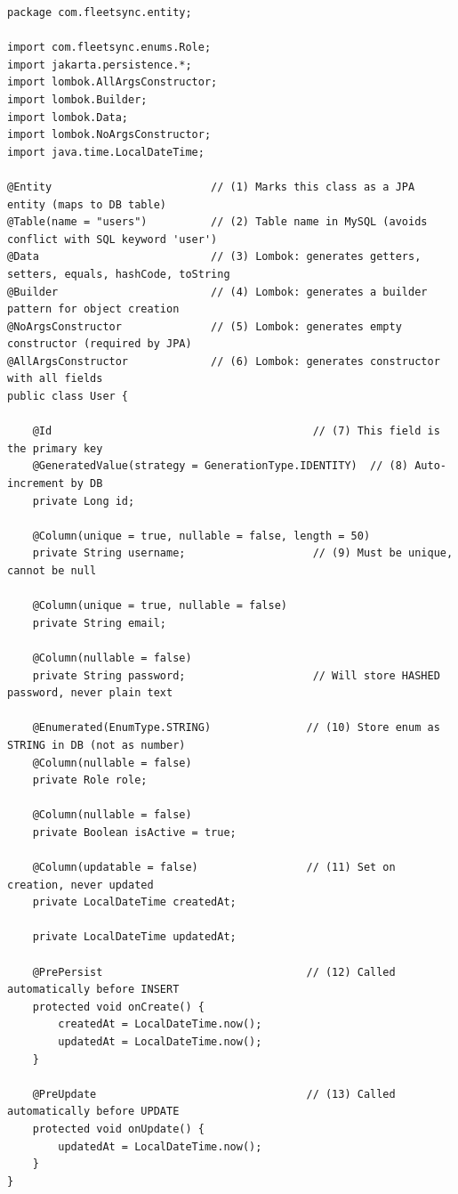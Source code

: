 \documentclass[12pt,a4paper]{report}
\begin{document}
\begin{lstlisting}[caption=User.java -- The User Entity]
package com.fleetsync.entity;

import com.fleetsync.enums.Role;
import jakarta.persistence.*;
import lombok.AllArgsConstructor;
import lombok.Builder;
import lombok.Data;
import lombok.NoArgsConstructor;
import java.time.LocalDateTime;

@Entity                         // (1) Marks this class as a JPA entity (maps to DB table)
@Table(name = "users")          // (2) Table name in MySQL (avoids conflict with SQL keyword 'user')
@Data                           // (3) Lombok: generates getters, setters, equals, hashCode, toString
@Builder                        // (4) Lombok: generates a builder pattern for object creation
@NoArgsConstructor              // (5) Lombok: generates empty constructor (required by JPA)
@AllArgsConstructor             // (6) Lombok: generates constructor with all fields
public class User {

    @Id                                         // (7) This field is the primary key
    @GeneratedValue(strategy = GenerationType.IDENTITY)  // (8) Auto-increment by DB
    private Long id;

    @Column(unique = true, nullable = false, length = 50)
    private String username;                    // (9) Must be unique, cannot be null

    @Column(unique = true, nullable = false)
    private String email;

    @Column(nullable = false)
    private String password;                    // Will store HASHED password, never plain text

    @Enumerated(EnumType.STRING)               // (10) Store enum as STRING in DB (not as number)
    @Column(nullable = false)
    private Role role;

    @Column(nullable = false)
    private Boolean isActive = true;

    @Column(updatable = false)                 // (11) Set on creation, never updated
    private LocalDateTime createdAt;

    private LocalDateTime updatedAt;

    @PrePersist                                // (12) Called automatically before INSERT
    protected void onCreate() {
        createdAt = LocalDateTime.now();
        updatedAt = LocalDateTime.now();
    }

    @PreUpdate                                 // (13) Called automatically before UPDATE
    protected void onUpdate() {
        updatedAt = LocalDateTime.now();
    }
}
\end{lstlisting}
\end{document}
